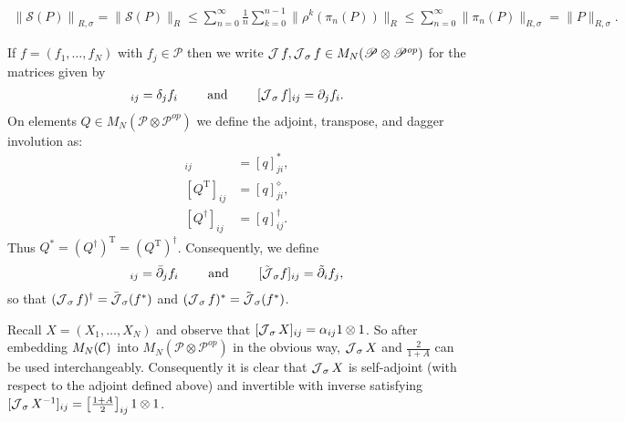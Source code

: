 	\begin{align*}
		\left\| \mathscr{S}(P)\right\|_{R,\sigma}=\|\mathscr{S}(P)\|_{R}\leq \sum_{n=0}^\infty \frac{1}{n}\sum_{k=0}^{n-1}\|\rho^k(\pi_n(P))\|_R \leq \sum_{n=0}^\infty \| \pi_n(P)\|_{R,\sigma} =\|P\|_{R,\sigma}.
	\end{align*}\par
If $f=(f_1,\ldots, f_N)$ with $f_j\in\mathscr{P}$ then we write $\operatorname{\mathcal J} f,\operatorname{\mathcal J}_\sigma f \in M_{N}(\mathscr{P}\otimes\mathscr{P}^{op})$ for the matrices given by
	\begin{align*}
		[\J f]_{ij}=\delta_j f_i\qquad\text{ and }\qquad [\J_\sigma f]_{ij}=\partial_j f_i.
	\end{align*}
On elements $Q\in M_N(\mathscr{P}\otimes \mathscr{P}^{op})$ we define the adjoint, transpose, and dagger involution as:
	\begin{align*}
		[Q^*]_{ij}&=[q]_{ji}^*,\\
		[Q^\text{T}]_{ij}&=[q]_{ji}^\diamond,\\
		[Q^\dagger]_{ij}&=[q]_{ij}^\dagger.
	\end{align*}
Thus $Q^*=(Q^\dagger)^\text{T}=(Q^\text{T})^\dagger$. Consequently, we define
	\begin{align*}
		[\bar{\J}_\sigma f]_{ij}=\bar{\partial}_j f_i\qquad\text{ and }\qquad [\tilde{\J}_\sigma f]_{ij} = \tilde{\partial}_i f_j,
	\end{align*}
so that $(\operatorname{\mathcal J}_\sigma f)^\dagger= \bar{\operatorname{\mathcal J}}_\sigma (f^*)$ and $(\operatorname{\mathcal J}_\sigma f)^*=\tilde{\operatorname{\mathcal J}}_\sigma(f^*)$.\par

Recall $X=(X_1,\ldots, X_N)$ and observe that $[\operatorname{\mathcal J}_\sigma X]_{ij}=\alpha_{ij}1\otimes 1$.  So after embedding $M_{N}(\mathcal C)$ into $M_{N} (\mathscr{P}\otimes\mathscr{P}^{op})$ in the obvious way,  $\operatorname{\mathcal J}_\sigma X$ and $\frac{2}{1+A}$ can be used interchangeably. Consequently it is clear that $\operatorname{\mathcal J}_\sigma X$ is self-adjoint (with respect to the adjoint defined above) and invertible with inverse satisfying $[\operatorname{\mathcal J}_\sigma X^{-1}]_{ij} = \left[\frac{1+A}{2}\right]_{ij} 1\otimes 1$.\par

